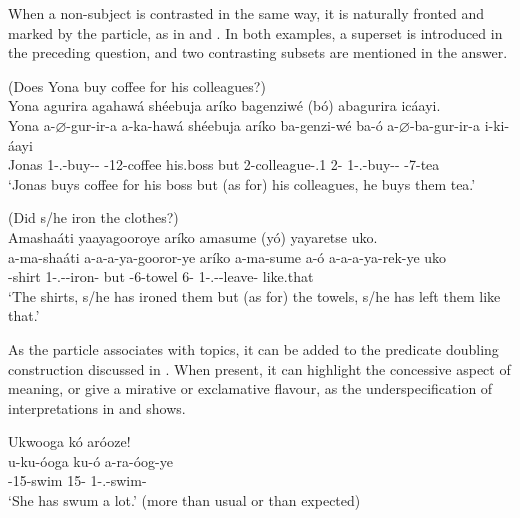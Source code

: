 \documentclass[output=paper]{langscibook}
\begin{document}
\z

When a non-subject is contrasted in the same way, it is naturally fronted and marked by the particle, as in  and . In both examples, a superset is introduced in the preceding question, and two contrasting subsets are mentioned in the answer.

\ea
\label{bkm:Ref75184712}
(Does Yona buy coffee for his colleagues?)\\
Yona agurira agahawá shéebuja aríko bagenziwé (bó) abagurira icáayi.\\
\gll
Yona  a-$\varnothing$-gur-ir-a  a-ka-hawá  shéebuja  aríko  ba-genzi-wé   ba-ó  a-$\varnothing$-ba-gur-ir-a  i-ki-áayi \\
Jonas  1\SM-\PRS.\CJ{}-buy-\APPL-\FV{}  \AUG{}-12-coffee  his.boss  but  2-colleague-\POSS.1{}   2-\CM{}  1\SM-\PRS.\OM{}-buy-\APPL-\FV{}  \AUG{}-7-tea \\
\glt
  ‘Jonas buys coffee for his boss but (as for) his colleagues, he buys them tea.’\\

\z

\ea
\label{bkm:Ref75184713}
(Did s/he iron the clothes?)\\
Amashaáti yaayagooroye aríko amasume (yó) yayaretse uko.\\
\gll
a-ma-shaáti  a-a-a-ya-gooror-ye  aríko  a-ma-sume  a-ó   a-a-a-ya-rek-ye  uko \\
-{}shirt  1\SM-\N.\PST-\OM{}-iron-\PFV{}  but  \AUG-{}6-towel  6-\CM{}   1\SM-\N.\PST-\OM-{}leave-\PFV{}  like.that \\
\glt
  ‘The shirts, s/he has ironed them but (as for) the towels, s/he has left them like that.’\\

\z

As the particle associates with topics, it can be added to the predicate doubling construction discussed in . When present, it can highlight the concessive aspect of meaning, or give a mirative or exclamative flavour, as the underspecification of interpretations in  and  shows.

\ea
\label{bkm:Ref81509745}
\label{bkm:Ref75263857}Ukwooga kó aróoze!\\
\gll
u-ku-óoga  ku-ó  a-ra-óog-ye\\
\AUG{}-15-swim  15-\CM{}  1\SM{}-\PRS.\DJ{}-swim-\PFV{}\\
\glt
‘She has swum a lot.’ (more than usual or than expected)\\
\end{document}

